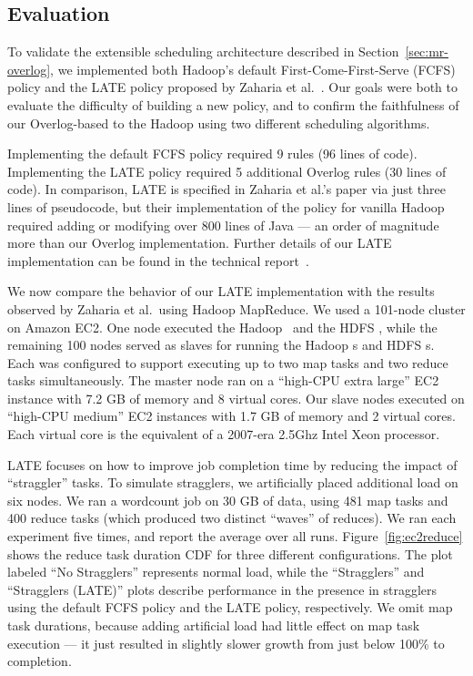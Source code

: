 \subsection{Evaluation}
\label{sec:schedeval}
To validate the extensible scheduling architecture described in
Section~\ref{sec:mr-overlog}, we implemented both Hadoop's default
First-Come-First-Serve (FCFS) policy and the LATE policy proposed by Zaharia et
al.~\cite{late-sched}. Our goals were both to evaluate the difficulty of
building a new policy, and to confirm the faithfulness of our Overlog-based
{\JT} to the Hadoop {\JT} using two different scheduling algorithms.

Implementing the default FCFS policy required 9 rules (96 lines of
code). Implementing the LATE policy required 5 additional Overlog rules (30
lines of code). In comparison, LATE is specified in Zaharia et al.'s paper via
just three lines of pseudocode, but their implementation of the policy for
vanilla Hadoop required adding or modifying over 800 lines of Java --- an order
of magnitude more than our Overlog implementation. Further details of our LATE
implementation can be found in the technical report~\cite{boom-techr}.

We now compare the behavior of our LATE implementation with the results observed
by Zaharia et al.\ using Hadoop MapReduce. We used a 101-node cluster on Amazon
EC2. One node executed the Hadoop \JT\ and the HDFS \NN, while the remaining 100
nodes served as slaves for running the Hadoop {\TT}s and HDFS {\DN}s. Each {\TT}
was configured to support executing up to two map tasks and two reduce tasks
simultaneously. The master node ran on a ``high-CPU extra large'' EC2 instance
with 7.2 GB of memory and 8 virtual cores. Our slave nodes executed on
``high-CPU medium'' EC2 instances with 1.7 GB of memory and 2 virtual
cores. Each virtual core is the equivalent of a 2007-era 2.5Ghz Intel Xeon
processor.

LATE focuses on how to improve job completion time by reducing the impact of
``straggler'' tasks. To simulate stragglers, we artificially placed additional
load on six nodes. We ran a wordcount job on 30 GB of data, using 481 map tasks
and 400 reduce tasks (which produced two distinct ``waves'' of reduces). We ran
each experiment five times, and report the average over all
runs. Figure~\ref{fig:ec2reduce} shows the reduce task duration CDF for three
different configurations. The plot labeled ``No Stragglers'' represents normal
load, while the ``Stragglers'' and ``Stragglers (LATE)'' plots describe
performance in the presence in stragglers using the default FCFS policy and the
LATE policy, respectively. We omit map task durations, because adding artificial
load had little effect on map task execution --- it just resulted in slightly
slower growth from just below 100\% to completion.

